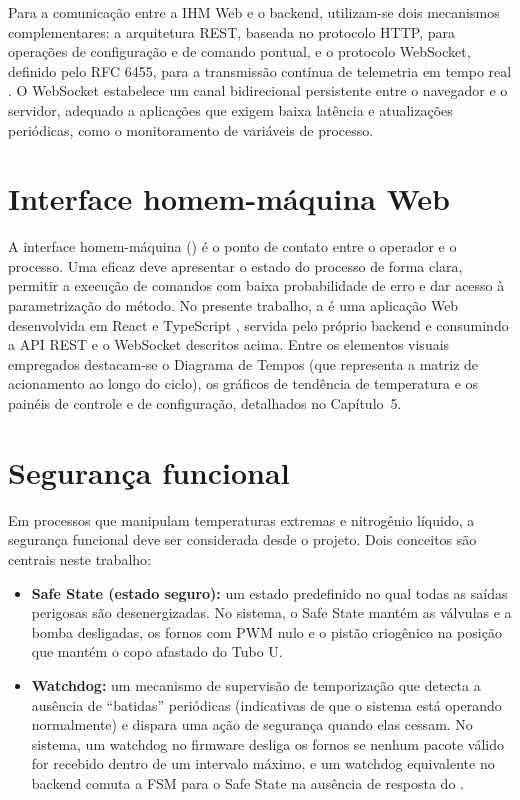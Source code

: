 Para a comunica\c{c}\~ao entre a IHM Web e o backend, utilizam-se dois
mecanismos complementares: a arquitetura REST, baseada no protocolo HTTP, para
opera\c{c}\~oes de configura\c{c}\~ao e de comando pontual, e o protocolo
WebSocket, definido pelo RFC 6455, para a transmiss\~ao cont\'inua de telemetria
em tempo real \cite{fette2011}. O WebSocket estabelece um canal bidirecional
persistente entre o navegador e o servidor, adequado a aplica\c{c}\~oes que
exigem baixa lat\^encia e atualiza\c{c}\~oes peri\'odicas, como o monitoramento
de vari\'aveis de processo.

\section{Interface homem-m\'aquina Web}

A interface homem-m\'aquina (\ihm) \'e o ponto de contato entre o operador e o
processo. Uma \ihm eficaz deve apresentar o estado do processo de forma clara,
permitir a execu\c{c}\~ao de comandos com baixa probabilidade de erro e dar
acesso \`a parametriza\c{c}\~ao do m\'etodo. No presente trabalho, a \ihm \'e
uma aplica\c{c}\~ao Web desenvolvida em React e TypeScript \cite{react}, servida
pelo pr\'oprio backend e consumindo a API REST e o WebSocket descritos acima.
Entre os elementos visuais empregados destacam-se o Diagrama de Tempos (que
representa a matriz de acionamento ao longo do ciclo), os gr\'aficos de
tend\^encia de temperatura e os pain\'eis de controle e de configura\c{c}\~ao,
detalhados no Cap\'itulo~5.

\section{Seguran\c{c}a funcional}

Em processos que manipulam temperaturas extremas e nitrog\^enio l\'iquido, a
seguran\c{c}a funcional deve ser considerada desde o projeto. Dois conceitos
s\~ao centrais neste trabalho:

\begin{itemize}
  \item \textbf{Safe State (estado seguro):} um estado predefinido no qual todas
  as sa\'idas perigosas s\~ao desenergizadas. No sistema, o Safe State mant\'em
  as v\'alvulas e a bomba desligadas, os fornos com PWM nulo e o pist\~ao
  criog\^enico na posi\c{c}\~ao que mant\'em o copo afastado do Tubo U.
  \item \textbf{Watchdog:} um mecanismo de supervis\~ao de temporiza\c{c}\~ao que
  detecta a aus\^encia de ``batidas'' peri\'odicas (indicativas de que o sistema
  est\'a operando normalmente) e dispara uma a\c{c}\~ao de seguran\c{c}a quando
  elas cessam. No sistema, um watchdog no firmware desliga os fornos se nenhum
  pacote v\'alido for recebido dentro de um intervalo m\'aximo, e um watchdog
  equivalente no backend comuta a FSM para o Safe State na aus\^encia de
  resposta do \daq.
\end{itemize}

